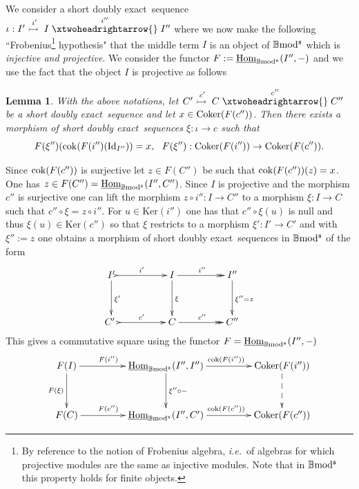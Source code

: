 \documentclass[12pt]{article}
\newtheorem{lem}[thm]{Lemma}
\def\Homi{{\underline{\rm Hom}}}
\def\id{{\rm id}}
\def\coker{{\rm Coker}}
\def\scoker{{\rm cok}}
\def\B{{\mathbb B}}
\def\exxx{{doubly exact}~}
\newcommand{\ie}{{\it i.e.\/}\ }
\def\id{{\mbox{Id}}}
\def\ker{{\mbox{Ker}}}
\def\b2{{\rm \B mod^{\mathfrak s}}}
\begin{document}
We consider a short \exxx sequence $\iota:I'\stackrel{i'}{\rightarrowtail{}} I \stackrel{i''}{\xtwoheadrightarrow{}} I''$ where we now make the following ``Frobenius\footnote{By reference to the notion of Frobenius algebra, \ie of algebras for which projective modules are the same as injective modules. Note that in $\b2$ this property holds for finite objects.} hypothesis" that the middle term $I$ is an object of $\b2$ which is {\em injective and projective}. 
We consider the functor $F:=\Homi_\b2(I'',-)$ and we use the fact that the object $I$ is projective as follows 
 \begin{lem}\label{sequence s2}
 With the above notations, let 	$C'\stackrel{c'}{\rightarrowtail{}} C \stackrel{c''}{\xtwoheadrightarrow{}} C''$ be a short \exxx sequence  and let $x\in \coker(F(c''))$. Then there exists a morphism of short \exxx sequences $\xi:\iota\to c$ such that 
 \begin{equation}\label{gc trick}
F(\xi'')(\scoker(F(i'')(\id_{I''}))=x,\ \  F(\xi''): \coker(F(i''))\to \coker(F(c'')).	
\end{equation}
 \end{lem}
\proof Since $\scoker(F(c''))$ is surjective let $z\in F(C'')$ be such that $\scoker(F(c''))(z)=x$. One has  $z\in F(C'')=\Homi_\b2(I'',C'')$. Since $I$ is projective and the morphism $c''$ is surjective one can lift the morphism $z\circ i'':I\to C''$ to a morphism $\xi:I\to C$ such that $c''\circ \xi= z\circ i''$. For $u \in \ker(i'')$ one has that $c''\circ \xi(u)$ is null and thus $\xi(u)\in \ker(c'')$ so that $\xi$ restricts to a morphism $\xi':I'\to C'$ and with $\xi'':=z$ one obtains 
a morphism of short \exxx sequences in $\b2$ of the form
\begin{equation}\label{use of proj}
\xymatrix@C=20pt@R=35pt{
  I'\ar[d]^{\xi'}\ar@{>->}[rr]^{i'} && I \ar[d]^{\xi} \ar@{->>}[rr]^{i''}&& I''\ar[d]^{\xi''=z}
\\
C' \ \ar@{>->}[rr]^{c'}&& C \ar@{->>}[rr]^{c''}&& C''}
\end{equation}
This gives a commutative square using the functor $F=\Homi_\b2(I'',-)$
\begin{equation}\label{applying F to sequ}
\xymatrix@C=20pt@R=35pt{
 F(I)\ar[d]_{F(\xi)} \ar[rr]^{\!\!\!\!\!\!\!\!\!\!\!\! F(i'')}&& \Homi_\b2(I'',I'')\ar[d]^{\xi''\circ - }\ar[rr]^{\;\;\scoker(F(i''))}&& \coker(F(i''))\ar@{-->}[d]
\\
 F(C) \ar[rr]^{\!\!\!\!\!\!\!\!\!\!\!\!  F(c'')}&& \Homi_\b2(I'',C') \ar[rr]^{\;\;\scoker(F(c''))}&& \coker(F(c''))}\end{equation}
\end{document}
